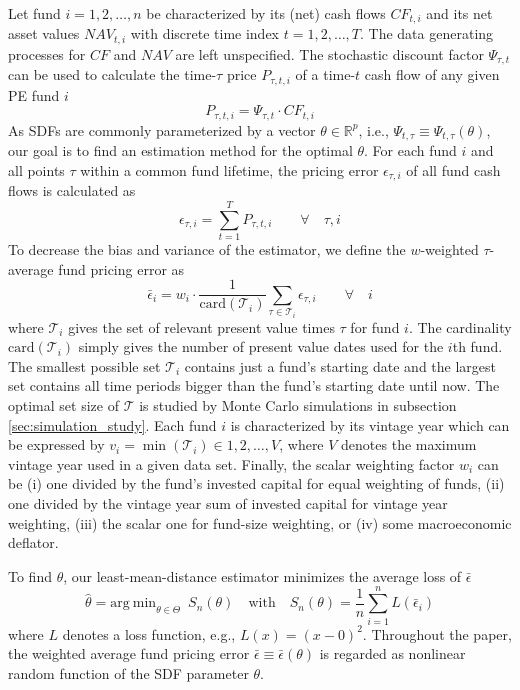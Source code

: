 \documentclass[12pt]{article}
\begin{document}
Let fund $i=1,2,\dots,n$ be characterized by its (net) cash flows ${CF}_{t,i}$ and its net asset values ${NAV}_{t,i}$ with discrete time index $t=1,2,\dots,T$.
The data generating processes for $CF$ and $NAV$ are left unspecified.
The stochastic discount factor $\Psi_{\tau,t}$ can be used to calculate the time-$\tau$ price $P_{\tau,t,i}$ of a time-$t$ cash flow of any given PE fund $i$
\begin{equation}
\label{eq:price}
P_{\tau,t,i} = \Psi_{\tau,t} \cdot CF_{t,i}
\end{equation}
As SDFs are commonly parameterized by a vector $\theta \in \mathbb{R}^p$, i.e., $\Psi_{t,\tau} \equiv \Psi_{t,\tau} (\theta)$, our goal is to find an estimation method for the optimal $\theta$.
For each fund $i$ and all points $\tau$ within a common fund lifetime, the pricing error $\epsilon_{\tau,i}$ of all fund cash flows is calculated as
\begin{equation}
\label{eq:pricing_error}
\epsilon_{\tau,i} = \sum_{t=1}^T P_{\tau,t,i} 
\qquad \forall \quad \tau,i
\end{equation}
To decrease the bias and variance of the \cite{DLP12} estimator, we define the $w$-weighted $\tau$-average fund pricing error as
\begin{equation}
\label{eq:average_pricing_error}
\bar{\epsilon}_{i} =
w_{i} \cdot
\frac{1}{ \mathrm{card}(\mathcal{T}_{i}) }
\sum_{\tau \in \mathcal{T}_{i}}
\epsilon_{\tau,i}
\qquad \forall \quad i
\end{equation}
where $\mathcal{T}_i$ gives the set of relevant present value times $\tau$ for fund $i$.
The cardinality $\mathrm{card}(\mathcal{T}_{i})$ simply gives the number of present value dates used for the $i$th fund.
The smallest possible set $\mathcal{T}_i$ contains just a fund's starting date and the largest set contains all time periods bigger than the fund's starting date until now.
The optimal set size of $\mathcal{T}$ is studied by Monte Carlo simulations in subsection \ref{sec:simulation_study}.
Each fund $i$ is characterized by its vintage year which can be expressed by $v_{i}=\min(\mathcal{T}_i) \in 1,2,\dots,V$, where $V$ denotes the maximum vintage year used in a given data set.
Finally, the scalar weighting factor $w_i$ can be (i) one divided by the fund's invested capital for equal weighting of funds, (ii) one divided by the vintage year sum of invested capital for vintage year weighting, (iii) the scalar one for fund-size weighting, or (iv) some macroeconomic deflator.

To find $\theta$, our least-mean-distance estimator minimizes the average loss of $\bar{\epsilon}$
\begin{equation}
\label{eq:estimator}
\hat{\theta} = 
\mathrm{arg \ min}_{\theta \in \Theta}
\enspace
S_n(\theta)
\quad
\mathrm{with}
\quad
S_n(\theta) = 
\frac{1}{n}
\sum_{i=1}^n
L \left( \bar{\epsilon}_{i} \right) 
\end{equation}
where $L$ denotes a loss function, e.g., $L(x)=(x-0)^2$.
Throughout the paper, the weighted average fund pricing error $\bar{\epsilon} \equiv \bar{\epsilon}(\theta)$ is regarded as nonlinear random function of the SDF parameter $\theta$.
\end{document}
